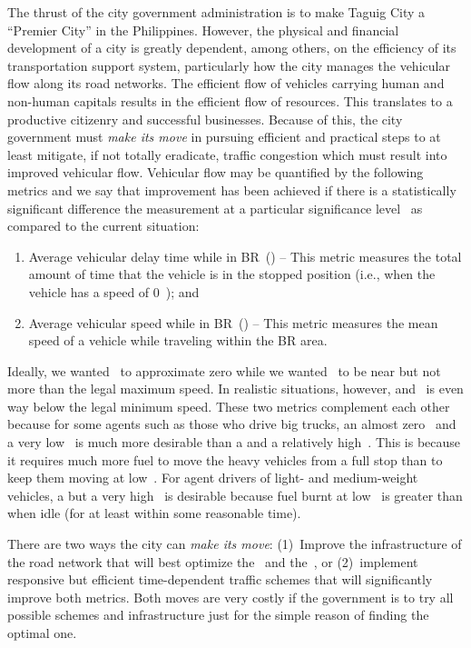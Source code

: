 \documentclass[preprint]{./acm_proc_article-sp}
\begin{document}
The thrust of the city government administration is to make Taguig City a ``Premier City'' in the Philippines. However,  the physical and financial development of a city is greatly dependent, among others, on the efficiency of its transportation support system, particularly how the city manages the vehicular flow along its road networks. The efficient flow of vehicles carrying human and non-human capitals results in the efficient flow of resources. This translates to a productive citizenry and successful businesses. Because of this, the city government must {\em make its move} in pursuing efficient and practical steps to at least mitigate, if not totally eradicate, traffic congestion which must result into improved vehicular flow. Vehicular flow may be quantified by the following metrics and we say that improvement has been achieved if there is a statistically significant difference the measurement at a particular significance level~ as compared to the current situation:
\begin{enumerate}
\item Average vehicular delay time while in BR~() -- This metric measures the total amount of time that the vehicle is in the stopped position (i.e., when the vehicle has a speed of 0~); and
\item Average vehicular speed while in BR~() -- This metric measures the mean speed of a vehicle while traveling within the BR area. 
\end{enumerate}
Ideally, we wanted~ to approximate zero while we wanted~ to be near but not more than the legal maximum speed. In realistic situations, however,  and ~is even way below the legal minimum speed. These two metrics complement each other because for some agents such as those who drive big trucks, an almost zero~ and a very low~ is much more desirable than a  and a relatively high~. This is because it requires much more fuel to move the heavy vehicles from a full stop than to keep them moving at low~. For agent drivers of light- and medium-weight vehicles, a  but a very high~ is desirable because fuel burnt at low~ is greater than when idle (for at least within some reasonable time).

There are two ways the city can {\em make its move}: (1)~Improve the infrastructure of the road network that will best optimize the~ and the~, or (2)~implement responsive but efficient time-dependent traffic schemes that will significantly improve both metrics. Both moves are very costly if the government is to try all possible schemes and infrastructure just for the simple reason of finding the optimal one. 
\end{document}
